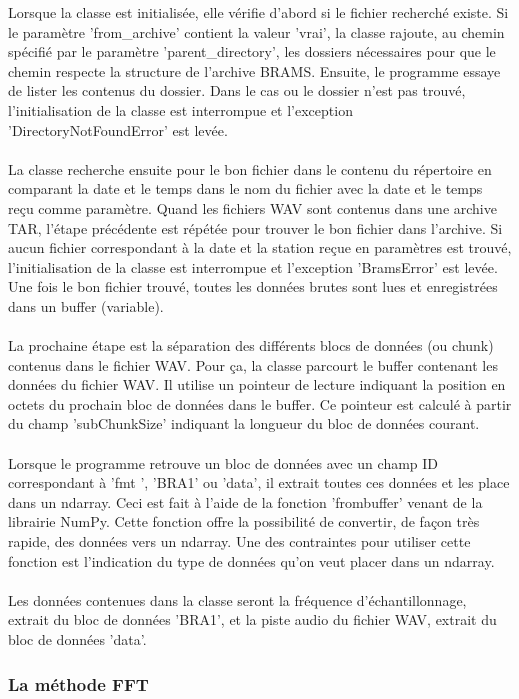 \documentclass[11pt]{article}
\begin{document}
Lorsque la classe est initialisée, elle vérifie d'abord si le fichier recherché existe.
Si le paramètre 'from\_archive' contient la valeur 'vrai', la classe rajoute, au chemin spécifié par le paramètre 'parent\_directory', les dossiers nécessaires pour que le chemin respecte la structure de l'archive BRAMS.
Ensuite, le programme essaye de lister les contenus du dossier.
Dans le cas ou le dossier n'est pas trouvé, l'initialisation de la classe est interrompue et l'exception 'DirectoryNotFoundError' est levée.\\
\\
La classe recherche ensuite pour le bon fichier dans le contenu du répertoire en comparant la date et le temps dans le nom du fichier avec la date et le temps reçu comme paramètre.
Quand les fichiers WAV sont contenus dans une archive TAR, l'étape précédente est répétée pour trouver le bon fichier dans l'archive.
Si aucun fichier correspondant à la date et la station reçue en paramètres est trouvé, l'initialisation de la classe est interrompue et l'exception 'BramsError' est levée.
Une fois le bon fichier trouvé, toutes les données brutes sont lues et enregistrées dans un buffer (variable).\\
\\
La prochaine étape est la séparation des différents blocs de données (ou chunk) contenus dans le fichier WAV.
Pour ça, la classe parcourt le buffer contenant les données du fichier WAV.
Il utilise un pointeur de lecture indiquant la position en octets du prochain bloc de données dans le buffer.
Ce pointeur est calculé à partir du champ 'subChunkSize' indiquant la longueur du bloc de données courant.\\
\\
Lorsque le programme retrouve un bloc de données avec un champ ID correspondant à 'fmt ', 'BRA1' ou 'data', il extrait toutes ces données et les place dans un ndarray.
Ceci est fait à l'aide de la fonction 'frombuffer' venant de la librairie NumPy.
Cette fonction offre la possibilité de convertir, de façon très rapide, des données vers un ndarray.
Une des contraintes pour utiliser cette fonction est l'indication du type de données qu'on veut placer dans un ndarray.\\
\\
Les données contenues dans la classe seront la fréquence d'échantillonnage, extrait du bloc de données 'BRA1', et la piste audio du fichier WAV, extrait du bloc de données 'data'.

\subsubsection{La méthode FFT}
\end{document}
